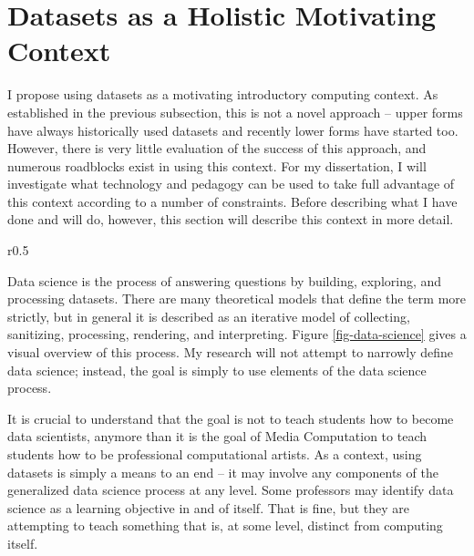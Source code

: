 \section{Datasets as a Holistic Motivating Context}

I propose using datasets as a motivating introductory computing context.
As established in the previous subsection, this is not a novel approach -- upper forms have always historically used datasets and recently lower forms have started too.
However, there is very little evaluation of the success of this approach, and numerous roadblocks exist in using this context.
For my dissertation, I will investigate what technology and pedagogy can be used to take full advantage of this context according to a number of constraints.
Before describing what I have done and will do, however, this section will describe this context in more detail.

\begin{wrapfigure}{r}{0.5\textwidth}
    \begin{center}
    \end{center}
    \vspace{-\bigskipamount}
    \caption{A generalized model of Data Science\protect\cite{data-science-diagram}}
    \label{fig-data-science}
\end{wrapfigure}

Data science is the process of answering questions by building, exploring, and processing datasets.
There are many theoretical models that define the term more strictly, but in general it is described as an iterative model of collecting, sanitizing, processing, rendering, and interpreting.
Figure \ref{fig-data-science} gives a visual overview of this process.
My research will not attempt to narrowly define data science; instead, the goal is simply to use elements of the data science process.

It is crucial to understand that the goal is not to teach students how to become data scientists, anymore than it is the goal of Media Computation to teach students how to be professional computational artists.
As a context, using datasets is simply a means to an end -- it may involve any components of the generalized data science process at any level.
Some professors may identify data science as a learning objective in and of itself. That is fine, but they are attempting to teach something that is, at some level, distinct from computing itself.

